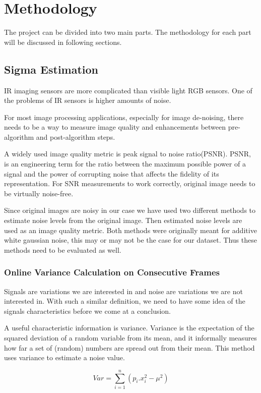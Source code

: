 \documentclass[10pt,twocolumn,letterpaper]{article}
\begin{document}
\section{Methodology}
The project can be divided into two main parts. The methodology for each part will be discussed in following sections.

\subsection{Sigma Estimation}
IR imaging sensors are more complicated than visible light RGB sensors. One of the problems of IR sensors is higher amounts of noise. 

For most image processing applications, especially for image de-noising, there needs to be a way to measure image quality and enhancements between pre-algorithm and post-algorithm steps.

A widely used image quality metric is peak signal to noise ratio(PSNR). PSNR, is an engineering term for the ratio between the maximum possible power of a signal and the power of corrupting noise that affects the fidelity of its representation\cite{wiki:psnr}. For SNR measurements to work correctly, original image needs to be virtually noise-free.

Since original images are noisy in our case we have used two different methods to estimate noise levels from the original image. Then estimated noise levels are used as an image quality metric. Both methods were originally meant for additive white gaussian noise, this may or may not be the case for our dataset. Thus these methods need to be evaluated as well.
\subsubsection{Online Variance Calculation on Consecutive Frames} \label{ss:online-var}
Signals are variations we are interested in and noise are variations we are not interested in. With such a similar definition, we need to have some idea of the signals characteristics before we come at a conclusion. 

A useful characteristic information is variance. Variance is the expectation of the squared deviation of a random variable from its mean, and it informally measures how far a set of (random) numbers are spread out from their mean\cite{wiki:variance}. This method uses variance to estimate a noise value.

\begin{displaymath}
Var = \sum_{i=1}^{n} (p_i.x^2_i - \mu^2)
\end{displaymath}\label{eq:disc-var}
\end{document}
